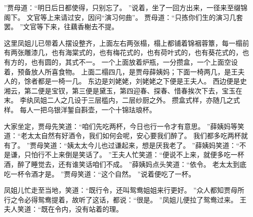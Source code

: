 ”贾母道：“明日后日都使得，只别忘了。
”说着，坐了一回方出来，一径来至缀锦阁下。
文官等上来请过安，因问“演习何曲”。
贾母道：“只拣你们生的演习几套罢。
”文官等下来，往藕香榭去不提。
\par
这里凤姐儿已带着人摆设整齐，上面左右两张榻，榻上都铺着锦裀蓉簟，每一榻前有两张雕漆几，也有海棠式的，也有梅花式的，也有荷叶式的，也有葵花式的，也有方的，也有圆的，其式不一。
一个上面放着炉瓶，一分攒盒，一个上面空设着，预备放人所喜食物。
上面二榻四几，是贾母薛姨妈；下面一椅两几，是王夫人的，馀者都是一椅一几。
东边是刘姥姥，刘姥姥之下便是王夫人。
西边便是史湘云，第二便是宝钗，第三便是黛玉，第四迎春、探春、惜春挨次下去，宝玉在末。
李纨凤姐二人之几设于三层槛内，二层纱厨之外。
攒盒式样，亦随几之式样。
每人一把乌银洋錾自斟壶，一个十锦珐琅杯。
\par
大家坐定，贾母先笑道：“咱们先吃两杯，今日也行一令才有意思。
”薛姨妈等笑道：“老太太自然有好酒令，我们如何会呢，安心要我们醉了。
我们都多吃两杯就有了。
”贾母笑道：“姨太太今儿也过谦起来，想是厌我老了。
”薛姨妈笑道：“不是谦，只怕行不上来倒是笑话了。
”王夫人忙笑道：“便说不上来，就便多吃一杯酒，醉了睡觉去，还有谁笑话咱们不成。
”薛姨妈点头笑道：“依令。
老太太到底吃一杯令酒才是。
”贾母笑道：“这个自然。
”说着便吃了一杯。
\par
凤姐儿忙走至当地，笑道：“既行令，还叫鸳鸯姐姐来行更好。
”众人都知贾母所行之令必得鸳鸯提着，故听了这话，都说：“很是。
”凤姐儿便拉了鸳鸯过来。
王夫人笑道：“既在令内，没有站着的理。
